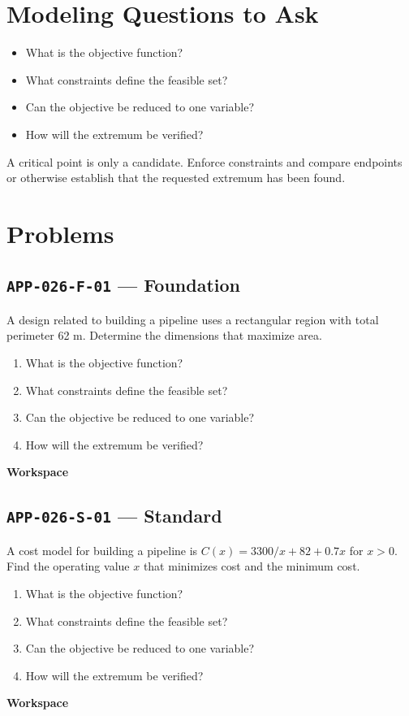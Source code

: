 \documentclass[11pt]{book}
\newcommand{\pid}[1]{\texttt{#1}}
\newcommand{\workspace}{\par\vspace{0.7in}\hrulefill\par\vspace{0.55in}\hrulefill\par}
\begin{document}
\section*{Modeling Questions to Ask}\begin{itemize}
\item What is the objective function?
\item What constraints define the feasible set?
\item Can the objective be reduced to one variable?
\item How will the extremum be verified?
\end{itemize}
\begin{errorbox}A critical point is only a candidate. Enforce constraints and compare endpoints or otherwise establish that the requested extremum has been found.\end{errorbox}
\section*{Problems}
\subsection*{\pid{APP-026-F-01} — Foundation}
\begin{problembox}
A design related to building a pipeline uses a rectangular region with total perimeter 62 m. Determine the dimensions that maximize area.
\end{problembox}
\begin{promptbox}\begin{enumerate}
\item What is the objective function?
\item What constraints define the feasible set?
\item Can the objective be reduced to one variable?
\item How will the extremum be verified?
\end{enumerate}\end{promptbox}
\textbf{Workspace}\workspace
{}
\subsection*{\pid{APP-026-S-01} — Standard}
\begin{problembox}
A cost model for building a pipeline is $C(x)=3300/x+82+0.7x$ for $x>0$. Find the operating value $x$ that minimizes cost and the minimum cost.
\end{problembox}
\begin{promptbox}\begin{enumerate}
\item What is the objective function?
\item What constraints define the feasible set?
\item Can the objective be reduced to one variable?
\item How will the extremum be verified?
\end{enumerate}\end{promptbox}
\textbf{Workspace}\workspace
{}
\end{document}
